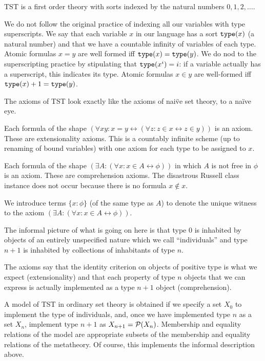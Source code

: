 \documentclass{slides}
\begin{document}
\begin{slide}

TST is a first order theory with sorts indexed by the natural numbers $0,1,2,\ldots$.

We do not follow the original practice of indexing all our variables with type superscripts.  We say that each variable $x$ in our language has a sort ${\tt type}(x)$ (a natural number) and that we have a countable infinity of variables of each type.  Atomic formulas $x=y$ are well formed iff ${\tt type}(x)={\tt type}(y)$.   We do nod to the superscripting practice by stipulating that  ${\tt type}(x^i)=i$:  if a variable actually has a superscript, this indicates its type.  Atomic formulas $x \in y$ are well-formed iff ${\tt type}(x)+1 = {\tt type}(y)$.

\end{slide}

\begin{slide}
 The axioms of TST look exactly like the axioms of nai\"ve set theory, to a na\"ive eye.
 
 Each formula of the shape \newline $(\forall xy:x=y \leftrightarrow (\forall z:z \in x \leftrightarrow z\in y))$ is an axiom.  These are extensionality axioms.  This is a countably infinite scheme (up to renaming of bound variables) with one axiom for each type to be assigned to $x$.
 
 Each formula of the shape \newline $(\exists A:(\forall x:x \in A \leftrightarrow \phi))$ in which $A$ is not free in $\phi$ is an axiom.  These are comprehension axioms.  The disastrous Russell class instance does not occur because there is no formula $x \not\in x$.
 
 We introduce terms $\{x:\phi\}$ (of the same type as $A$) to denote the unique witness to the axiom $(\exists A:(\forall x:x \in A \leftrightarrow \phi))$.

\end{slide}

\begin{slide}

The informal picture of what is going on here is that type 0 is inhabited by objects of an entirely unspecified nature which we call ``individuals'' and type $n+1$ is inhabited by collections of inhabitants of type $n$.

The axioms say that the identity criterion on objects of positive type is what we expect (extensionality) and that each property of type $n$ objects that we can express is actually implemented as a type $n+1$ object (comprehension).

A model of TST in ordinary set theory is obtained if we specify a set $X_0$ to implement the type of individuals, and, once we have implemented type $n$ as a set $X_n$, implement type $n+1$ as $X_{n+1}={\cal P}(X_n)$.  Membership and equality relations of the model are appropriate subsets of the membership and equality relations of the metatheory.  Of course, this implements the informal description above.


\end{slide}
\end{document}
